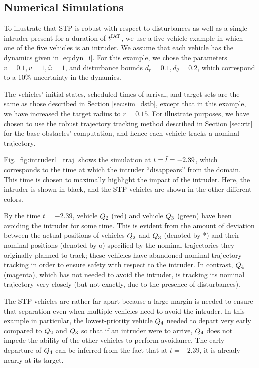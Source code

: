 \subsection{Numerical Simulations \label{sec:intruder_results}}
To illustrate that STP is robust with respect to disturbances as well as a single intruder present for a duration of $t^\text{IAT}$, we use a five-vehicle example in which one of the five vehicles is an intruder. We assume that each vehicle has the dynamics given in \eqref{eq:dyn_i}. For this example, we chose the parameters $\underline{v} = 0.1, \bar{v} = 1, \bar\omega = 1$, and disturbance bounds $d_{r} = 0.1, \bar{d_{\theta}} = 0.2$, which correspond to a 10\% uncertainty in the dynamics. 

The vehicles' initial states, scheduled times of arrival, and target sets are the same as those described in Section \ref{sec:sim_dstb}, except that in this example, we have increased the target radius to $r=0.15$. For illustrate purposes, we have chosen to use the robust trajectory tracking method described in Section \ref{sec:rtt} for the base obstacles' computation, and hence each vehicle tracks a nominal trajectory.

Fig. \ref{fig:intruder1_traj} shows the simulation at $t = \bar{t} = -2.39$, which corresponds to the time at which the intruder ``disappears'' from the domain. This time is chosen to maximally highlight the impact of the intruder. Here, the intruder is shown in black, and the STP vehicles are shown in the other different colors.

By the time $t = -2.39$, vehicle $Q_2$ (red) and vehicle $Q_3$ (green) have been avoiding the intruder for some time. This is evident from the amount of deviation between the actual positions of vehicles $Q_2$ and $Q_3$ (denoted by *) and their nominal positions (denoted by o) specified by the nominal trajectories they originally planned to track; these vehicles have abandoned nominal trajectory tracking in order to ensure safety with respect to the intruder. In contrast, $Q_4$ (magenta), which has not needed to avoid the intruder, is tracking its nominal trajectory very closely (but not exactly, due to the presence of disturbances).

The STP vehicles are rather far apart because a large margin is needed to ensure that separation even when multiple vehicles need to avoid the intruder. In this example in particular, the lowest-priority vehicle $Q_4$ needed to depart very early compared to $Q_2$ and $Q_3$ so that if an intruder were to arrive, $Q_4$ does not impede the ability of the other vehicles to perform avoidance. The early departure of $Q_4$ can be inferred from the fact that at $t=-2.39$, it is already nearly at its target.

